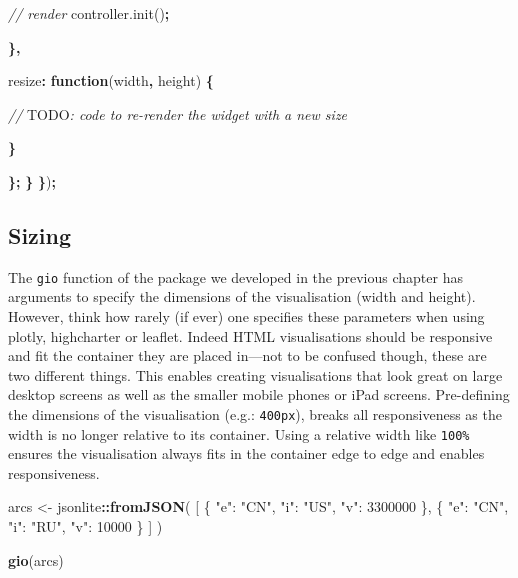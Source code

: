 \documentclass[
]{krantz}
\makeatletter
\newenvironment{Shaded}{\begin{snugshade}}{\end{snugshade}}
\newcommand{\AlertTok}[1]{\textcolor[rgb]{0.33,0.33,0.33}{#1}}
\newcommand{\AttributeTok}[1]{\textcolor[rgb]{0.61,0.61,0.61}{#1}}
\newcommand{\CommentTok}[1]{\textcolor[rgb]{0.37,0.37,0.37}{\textit{#1}}}
\newcommand{\DataTypeTok}[1]{\textcolor[rgb]{0.27,0.27,0.27}{#1}}
\newcommand{\KeywordTok}[1]{\textcolor[rgb]{0.27,0.27,0.27}{\textbf{#1}}}
\newcommand{\NormalTok}[1]{#1}
\newcommand{\OperatorTok}[1]{\textcolor[rgb]{0.43,0.43,0.43}{\textbf{#1}}}
\newcommand{\StringTok}[1]{\textcolor[rgb]{0.5,0.5,0.5}{#1}}
\newcommand{\VariableTok}[1]{\textcolor[rgb]{0,0,0}{#1}}
\newenvironment{kframe}{%
\medskip{}
\setlength{\fboxsep}{.8em}
 \def\at@end@of@kframe{}%
 \ifinner\ifhmode%
  \def\at@end@of@kframe{\end{minipage}}%
  \begin{minipage}{\columnwidth}%
 \fi\fi%
 \def\FrameCommand##1{\hskip\@totalleftmargin \hskip-\fboxsep
 \colorbox{shadecolor}{##1}\hskip-\fboxsep
     \hskip-\linewidth \hskip-\@totalleftmargin \hskip\columnwidth}%
 \MakeFramed {\advance\hsize-\width
   \@totalleftmargin\z@ \linewidth\hsize
   \@setminipage}}%
 {\par\unskip\endMakeFramed%
 \at@end@of@kframe}
\renewenvironment{Shaded}{\begin{kframe}}{\end{kframe}}
\makeatother
\begin{document}
\begin{Shaded}
\begin{Highlighting}[]
        \CommentTok{// render}
        \VariableTok{controller}\NormalTok{.}\AttributeTok{init}\NormalTok{()}\OperatorTok{;}

      \OperatorTok{\},}

      \DataTypeTok{resize}\OperatorTok{:} \KeywordTok{function}\NormalTok{(width}\OperatorTok{,}\NormalTok{ height) }\OperatorTok{\{}

        \CommentTok{// }\AlertTok{TODO}\CommentTok{: code to re{-}render the widget with a new size}

      \OperatorTok{\}}

    \OperatorTok{\};}
  \OperatorTok{\}}
\OperatorTok{\}}\NormalTok{)}\OperatorTok{;}
\end{Highlighting}
\end{Shaded}

\hypertarget{sizing}{%
\subsection{Sizing}\label{sizing}}

The \texttt{gio} function of the package we developed in the previous chapter has arguments to specify the dimensions of the visualisation (width and height). However, think how rarely (if ever) one specifies these parameters when using plotly, highcharter or leaflet. Indeed HTML visualisations should be responsive and fit the container they are placed in---not to be confused though, these are two different things. This enables creating visualisations that look great on large desktop screens as well as the smaller mobile phones or iPad screens. Pre-defining the dimensions of the visualisation (e.g.: \texttt{400px}), breaks all responsiveness as the width is no longer relative to its container. Using a relative width like \texttt{100\%} ensures the visualisation always fits in the container edge to edge and enables responsiveness.

\begin{Shaded}
\begin{Highlighting}[]
\NormalTok{arcs <{-}}\StringTok{ }\NormalTok{jsonlite}\OperatorTok{::}\KeywordTok{fromJSON}\NormalTok{(}
  \StringTok{\textquotesingle{}[}
\StringTok{    \{}
\StringTok{      "e": "CN",}
\StringTok{      "i": "US",}
\StringTok{      "v": 3300000}
\StringTok{    \},}
\StringTok{    \{}
\StringTok{      "e": "CN",}
\StringTok{      "i": "RU",}
\StringTok{      "v": 10000}
\StringTok{    \}}
\StringTok{  ]\textquotesingle{}}
\NormalTok{)}

\KeywordTok{gio}\NormalTok{(arcs)}
\end{Highlighting}
\end{Shaded}
\end{document}
